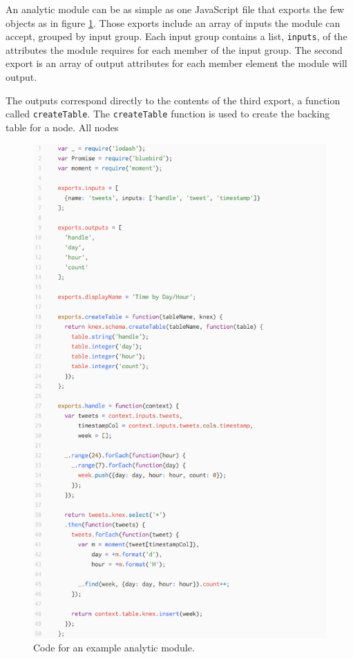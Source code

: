 \documentclass[midd]{thesis}
\begin{document}
An analytic module can be as simple as one JavaScript file that exports the few
objects as in figure \ref{fig:analyticmodule}. Those exports include an array
of inputs the module can accept, grouped by input group. Each input group
contains a list, \texttt{inputs}, of the attributes the module requires for each
member of the input group. The second export is an array of output attributes
for each member element the module will output.

The outputs correspond directly to the contents of the third export, a function called \texttt{createTable}. The \texttt{createTable} function is used to create the backing table for a node. All nodes

\begin{figure}[!ht]
  \centering
  \includegraphics[width=.85\textwidth]{analyticmodule}
  \caption{Code for an example analytic module.}
  \label{fig:analyticmodule}
\end{figure}
\end{document}
